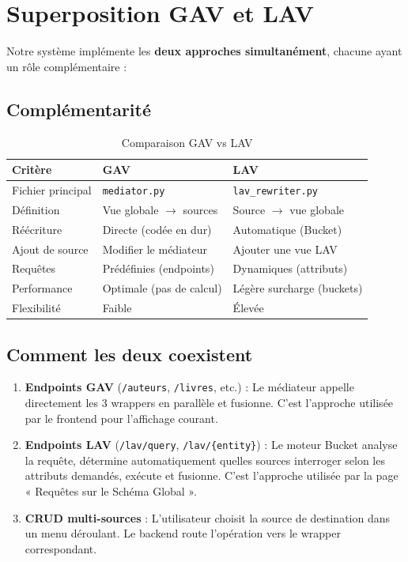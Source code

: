 \documentclass[12pt,a4paper]{article}
\begin{document}
\section{Superposition GAV et LAV}

Notre système implémente les \textbf{deux approches simultanément}, chacune ayant un rôle complémentaire :

\subsection{Complémentarité}

\begin{table}[H]
\centering
\begin{tabular}{lll}
\toprule
\textbf{Critère} & \textbf{GAV} & \textbf{LAV} \\
\midrule
Fichier principal & \texttt{mediator.py} & \texttt{lav\_rewriter.py} \\
Définition & Vue globale $\rightarrow$ sources & Source $\rightarrow$ vue globale \\
Réécriture & Directe (codée en dur) & Automatique (Bucket) \\
Ajout de source & Modifier le médiateur & Ajouter une vue LAV \\
Requêtes & Prédéfinies (endpoints) & Dynamiques (attributs) \\
Performance & Optimale (pas de calcul) & Légère surcharge (buckets) \\
Flexibilité & Faible & Élevée \\
\bottomrule
\end{tabular}
\caption{Comparaison GAV vs LAV}
\end{table}

\subsection{Comment les deux coexistent}

\begin{enumerate}
  \item \textbf{Endpoints GAV} (\texttt{/auteurs}, \texttt{/livres}, etc.) : Le médiateur appelle directement les 3 wrappers en parallèle et fusionne. C'est l'approche utilisée par le frontend pour l'affichage courant.

  \item \textbf{Endpoints LAV} (\texttt{/lav/query}, \texttt{/lav/\{entity\}}) : Le moteur Bucket analyse la requête, détermine automatiquement quelles sources interroger selon les attributs demandés, exécute et fusionne. C'est l'approche utilisée par la page « Requêtes sur le Schéma Global ».

  \item \textbf{CRUD multi-sources} : L'utilisateur choisit la source de destination dans un menu déroulant. Le backend route l'opération vers le wrapper correspondant.
\end{enumerate}
\end{document}
